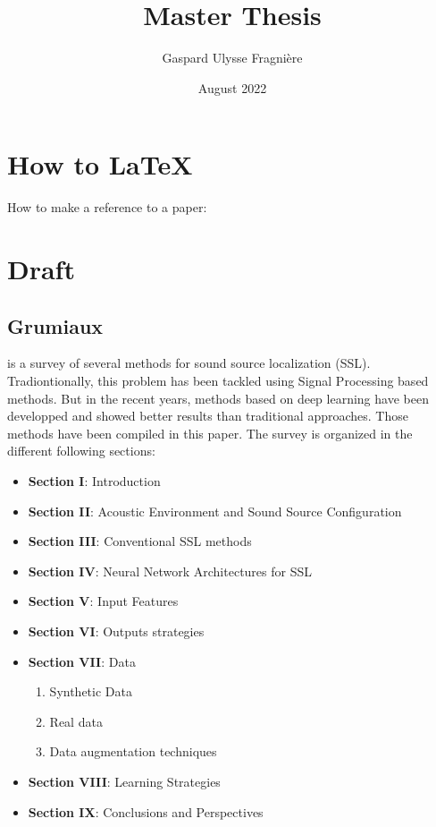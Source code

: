 \documentclass{article}
\title{Master Thesis}
\author{Gaspard Ulysse Fragnière}
\date{August 2022}
\begin{document}
\maketitle

\section{How to \LaTeX}

How to make a reference to a paper:\cite{grumiaux2022survey}


\section{Draft}

\subsection{Grumiaux}


\cite{grumiaux2022survey} is a survey of several methods for sound source localization (SSL). Tradiontionally, this problem has been tackled using Signal Processing based methods. But in the recent years, methods based on deep learning have been developped and showed better results than traditional approaches. Those methods have been compiled in this paper. The survey is organized in the different following sections:

\begin{itemize}
    \item \textbf{Section I}: Introduction
    \item \textbf{Section II}: Acoustic Environment and Sound Source Configuration
    \item \textbf{Section III}: Conventional SSL methods
    \item \textbf{Section IV}: Neural Network Architectures for SSL
    \item \textbf{Section V}: Input Features
    \item \textbf{Section VI}: Outputs strategies
    \item \textbf{Section VII}: Data
    \begin{enumerate}
        \item Synthetic Data
        \item Real data
        \item Data augmentation techniques
    \end{enumerate}    
        
    \item \textbf{Section VIII}: Learning Strategies
    \item \textbf{Section IX}: Conclusions and Perspectives
    
\end{itemize}
\end{document}
